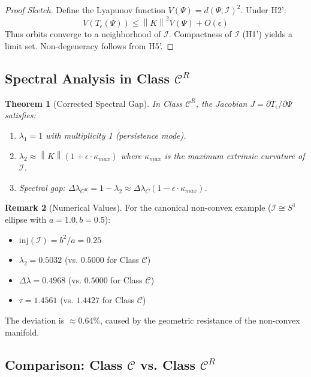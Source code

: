 \documentclass[11pt,a4paper]{article}
\theoremstyle{plain}
\newtheorem{theorem}{Theorem}[section]
\theoremstyle{definition}
\newtheorem{remark}[theorem]{Remark}
\newcommand{\I}{\mathcal{I}}
\newcommand{\norm}[1]{\left\lVert #1 \right\rVert}
\begin{document}
\begin{proof}[Proof Sketch]
Define the Lyapunov function $V(\Psi) = d(\Psi, \I)^2$. Under H2':
\[
V(T_\epsilon(\Psi)) \leq \norm{K}^2 V(\Psi) + O(\epsilon)
\]
Thus orbits converge to a neighborhood of $\I$. Compactness of $\I$ (H1') yields a limit set. Non-degeneracy follows from H5'.
\end{proof}

\subsection{Spectral Analysis in Class $\mathscr{C}^R$}

\begin{theorem}[Corrected Spectral Gap]\label{thm:spectral_CR}
In Class $\mathscr{C}^R$, the Jacobian $J = \partial T_\epsilon / \partial \Psi$ satisfies:
\begin{enumerate}
    \item $\lambda_1 = 1$ with multiplicity 1 (persistence mode).
    \item $\lambda_2 \approx \norm{K}(1 + \epsilon \cdot \kappa_{max})$ where $\kappa_{max}$ is the maximum extrinsic curvature of $\I$.
    \item Spectral gap: $\Delta\lambda_{C^R} = 1 - \lambda_2 \approx \Delta\lambda_C (1 - \epsilon \cdot \kappa_{max})$.
\end{enumerate}
\end{theorem}

\begin{remark}[Numerical Values]
For the canonical non-convex example ($\I \cong S^1$ ellipse with $a=1.0, b=0.5$):
\begin{itemize}
    \item $\text{inj}(\I) = b^2/a = 0.25$
    \item $\lambda_2 = 0.5032$ (vs. $0.5000$ for Class $\mathscr{C}$)
    \item $\Delta\lambda = 0.4968$ (vs. $0.5000$ for Class $\mathscr{C}$)
    \item $\tau = 1.4561$ (vs. $1.4427$ for Class $\mathscr{C}$)
\end{itemize}
The deviation is $\approx 0.64\%$, caused by the geometric resistance of the non-convex manifold.
\end{remark}

\subsection{Comparison: Class $\mathscr{C}$ vs. Class $\mathscr{C}^R$}
\end{document}
